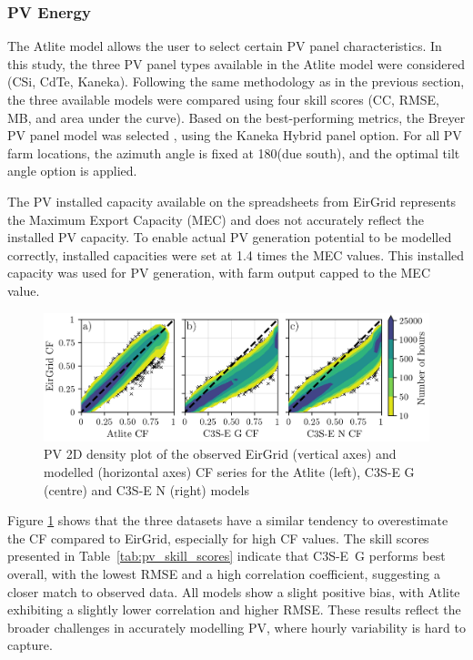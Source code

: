 \documentclass[a4paper, 11p1t]{article}
\begin{document}
\newpage
\subsubsection{PV Energy}
\label{sec:pv_verification}

The Atlite model allows the user to select certain PV panel characteristics. In this study, the three PV panel types available in the Atlite model were considered (CSi, CdTe, Kaneka). Following the same methodology as in the previous section, the three available models were compared using four skill scores (CC, RMSE, MB, and area under the curve). Based on the best-performing metrics, the Breyer PV panel model was selected \cite{beyer2004pv}, using the Kaneka Hybrid panel option. For all PV farm locations, the azimuth angle is fixed at 180\textdegree (due south), and the optimal tilt angle option is applied. 

The PV installed capacity available on the spreadsheets from EirGrid represents the Maximum Export Capacity (MEC) and does not accurately reflect the installed PV capacity. To enable actual PV generation potential to be modelled correctly, installed capacities were set at 1.4 times the MEC values. This installed capacity was used for PV generation, with farm output capped to the MEC value.

\begin{figure}[h!]
	\centering
	\includegraphics{verification_pv_contour.png}
	\caption{PV 2D density plot of the observed EirGrid (vertical axes) and modelled (horizontal axes) CF series for the Atlite  (left), C3S-E G (centre) and C3S-E N (right) models}	
	\label{fig:solar_verification_contour}
\end{figure}

Figure \ref{fig:solar_verification_contour} shows that the three datasets have a similar tendency to overestimate the CF compared to EirGrid, especially for high CF values. The skill scores presented in Table~\ref{tab:pv_skill_scores} indicate that C3S-E~G performs best overall, with the lowest RMSE and a high correlation coefficient, suggesting a closer match to observed data. All models show a slight positive bias, with Atlite exhibiting a slightly lower correlation and higher RMSE. These results reflect the broader challenges in accurately modelling PV, where hourly variability is hard to capture.
\end{document}
